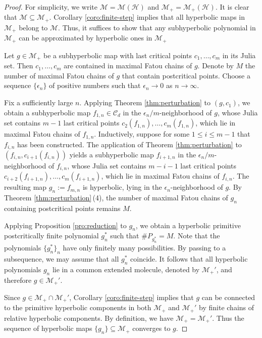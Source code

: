 \documentclass[a4paper,reqno,times, 11pt]{amsart}
\theoremstyle{remark}
\theoremstyle{plain}
\numberwithin{equation}{section}
\def\MMMM{{\cal M}}
\def\MMMM{\mathscr M}
\def\HHHH{\mathscr H}
\def\CCCC{\mathscr C}
\def\cal{\mathcal}
\begin{document}
\begin{proof}
	For simplicity, we write $\MMMM=\MMMM(\HHHH)$ and $\MMMM_+=\MMMM_+(\HHHH)$.
	It is clear that $\MMMM\subseteq\MMMM_+$. Corollary \ref{coro:finite-step} implies that all hyperbolic maps in $\MMMM_+$ belong to $\MMMM$.
	Thus, it suffices to show that any subhyperbolic polynomial in $\MMMM_+$ can be approximated by hyperbolic ones in $\MMMM_+$
	
	Let $g\in\MMMM_+$ be a subhyperbolic map with last critical points $c_1,\ldots,c_m$  in its Julia set. Then $c_1,\ldots,c_m$ are contained in maximal Fatou chains of $g$. Denote by $M$ the number of maximal Fatou chains of $g$ that contain postcritical points.
	Choose a sequence $\{\epsilon_n\}$ of positive numbers such that $\epsilon_n\to 0$ as $n\to\infty$.
	
	Fix a sufficiently large $n$. Applying Theorem \ref{thm:perturbation} to $(g,c_1)$, we obtain a subhyperbolic map $f_{1,n}\in\CCCC_d$ in the $\epsilon_n/m$-neighborhood of $g$, whose Julia set contains $m-1$ last critical points  $c_2(f_{1,n}),\ldots,c_m(f_{1,n})$, which lie in maximal Fatou chains of $f_{1,n}$.
	Inductively, suppose for some $1\leq i\leq m-1$ that $f_{i,n}$ has been constructed. The application of Theorem \ref{thm:perturbation} to $(f_{i,n},c_{i+1}(f_{i,n}))$ yields a subhyperbolic map $f_{i+1,n}$ in the $\epsilon_n/m$-neighborhood of $f_{i,n}$,  whose Julia set contains $m-i-1$ last critical points  $c_{i+2}(f_{i+1,n}),\ldots,c_m(f_{i+1,n})$, which lie in maximal Fatou chains of $f_{i,n}$.
	The resulting map $g_n:=f_{m,n}$ is  hyperbolic, lying in the $\epsilon_n$-neighborhood of $g$. By Theorem \ref{thm:perturbation}\,(4), the number of maximal Fatou chains of $g_n$  containing postcritical points remains $M$.
	
	Applying Proposition \ref{pro:reduction} to $g_n$, we obtain a hyperbolic primitive postcritically finite polynomial $g_n^*$ such that $\# P_{g_{n}^*}=M$. Note that the polynomials $\{g_n^*\}_n$ have only finitely many possibilities.  By passing to a subsequence, we may assume that all $g_n^*$ coincide. It follows that all hyperbolic polynomials $g_n$ lie in a common extended molecule, denoted by $\MMMM_+'$, and therefore $g\in\MMMM_+'$.
	
	Since $g\in\MMMM_+\cap\MMMM_+'$,   Corollary  \ref{coro:finite-step} implies that  $g$ can be connected to the primitive hyperbolic components in both $\MMMM_+$ and $\MMMM_+'$ by finite chains of relative hyperbolic components. By definition, we have $\MMMM_+=\MMMM_+'$. Thus the sequence of hyperbolic maps $\{g_n\}\subseteq \MMMM_+$ converges to $g$.
\end{proof}
\end{document}
